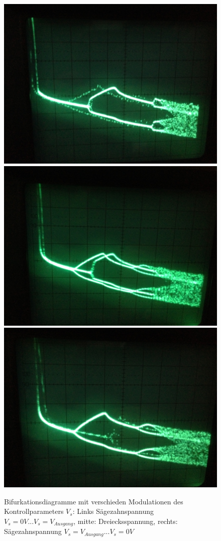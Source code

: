 \documentclass{scrartcl}
\begin{document}
\begin{figure}
\centering
\includegraphics[scale=0.12]{bif-ldr/dreieck_1}
\includegraphics[scale=0.12]{bif-ldr/dreieck_2}
\includegraphics[scale=0.12]{bif-ldr/dreieck_3}
\caption{Bifurkationsdiagramme mit verschieden Modulationen des Kontrollparameters $V_s$: Links Sägezahnspannung $V_s=0V...V_s=V_{Ausgang}$, mitte: Dreiecksspannung, rechts: Sägezahnspannung $V_s=V_{Ausgang}...V_s=0V$}
\label{fig:ldr-modellierung}
\end{figure}
\end{document}
